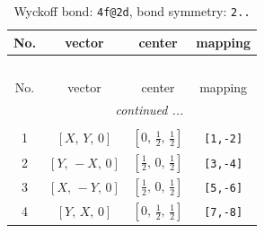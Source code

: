 \documentclass[fleqn,8pt]{jsarticle}
\begin{document}
\renewcommand{\arraystretch}{1.2}
\begin{longtable}{cccc}
\caption{Wyckoff bond: {\tt 4f@2d}, bond symmetry: {\tt 2..}}
 \\
 \hline \hline
No. & vector & center & mapping \\ \hline \endfirsthead

\multicolumn{3}{l}{\tablename\ \thetable{}} \\
 \hline \hline
No. & vector & center & mapping \\ \hline \endhead

 \hline \hline
\multicolumn{3}{r}{\footnotesize\it continued ...} \\ \endfoot

 \hline \hline
\multicolumn{3}{r}{} \\ \endlastfoot

1 & $\left[ X,\, Y,\, 0 \right]$ & $\left[ 0,\, \frac{1}{2},\, \frac{1}{2} \right]$ & {\tt [1,-2]} \\ \hline
2 & $\left[ Y,\, - X,\, 0 \right]$ & $\left[ \frac{1}{2},\, 0,\, \frac{1}{2} \right]$ & {\tt [3,-4]} \\ \hline
3 & $\left[ X,\, - Y,\, 0 \right]$ & $\left[ \frac{1}{2},\, 0,\, \frac{1}{2} \right]$ & {\tt [5,-6]} \\ \hline
4 & $\left[ Y,\, X,\, 0 \right]$ & $\left[ 0,\, \frac{1}{2},\, \frac{1}{2} \right]$ & {\tt [7,-8]} \\
\end{longtable}
\renewcommand{\arraystretch}{1.2}
\end{document}
